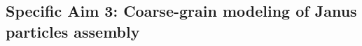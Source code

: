 \subsection{Specific Aim 3: Coarse-grain modeling of Janus particles assembly}
\label{sec:specificaim3}


